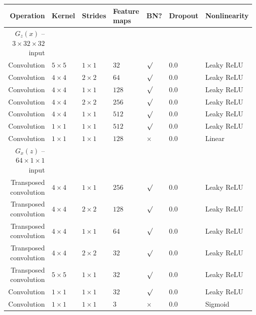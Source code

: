 \documentclass{article}
\begin{document}
\begin{table}[h]
\centering
\begin{tabular}{@{}rllllll@{}} \toprule
Operation              & Kernel       & Strides      & Feature maps & BN?      & Dropout & Nonlinearity \\ \midrule
$G_z(x)$ -- $3 \times 32 \times 32$ input                                                             \\
Convolution            & $5 \times 5$ & $1 \times 1$ & $32$         & $\surd$  & 0.0     & Leaky ReLU \\
Convolution            & $4 \times 4$ & $2 \times 2$ & $64$         & $\surd$  & 0.0     & Leaky ReLU \\
Convolution            & $4 \times 4$ & $1 \times 1$ & $128$        & $\surd$  & 0.0     & Leaky ReLU \\
Convolution            & $4 \times 4$ & $2 \times 2$ & $256$        & $\surd$  & 0.0     & Leaky ReLU \\
Convolution            & $4 \times 4$ & $1 \times 1$ & $512$        & $\surd$  & 0.0     & Leaky ReLU \\
Convolution            & $1 \times 1$ & $1 \times 1$ & $512$        & $\surd$  & 0.0     & Leaky ReLU \\
Convolution            & $1 \times 1$ & $1 \times 1$ & $128$        & $\times$ & 0.0     & Linear     \\
$G_x(z)$ -- $64 \times 1 \times 1$ input                                                              \\
Transposed convolution & $4 \times 4$ & $1 \times 1$ & $256$        & $\surd$  & 0.0     & Leaky ReLU \\
Transposed convolution & $4 \times 4$ & $2 \times 2$ & $128$        & $\surd$  & 0.0     & Leaky ReLU \\
Transposed convolution & $4 \times 4$ & $1 \times 1$ & $64$         & $\surd$  & 0.0     & Leaky ReLU \\
Transposed convolution & $4 \times 4$ & $2 \times 2$ & $32$         & $\surd$  & 0.0     & Leaky ReLU \\
Transposed convolution & $5 \times 5$ & $1 \times 1$ & $32$         & $\surd$  & 0.0     & Leaky ReLU \\
Convolution            & $1 \times 1$ & $1 \times 1$ & $32$         & $\surd$  & 0.0     & Leaky ReLU \\
Convolution            & $1 \times 1$ & $1 \times 1$ & $3$          & $\times$ & 0.0     & Sigmoid    \\

\end{tabular}
\end{table}
\end{document}
